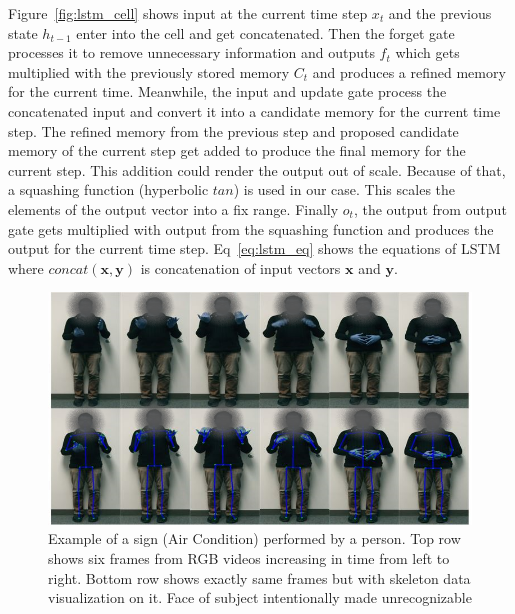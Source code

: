 \documentclass[10pt,twocolumn,letterpaper]{article}
\begin{document}
Figure~\ref{fig:lstm_cell} shows input at the current time step $x_t$ and the 
previous state $h_{t-1}$ enter into the cell and get concatenated. Then the forget gate processes it to remove
unnecessary information and outputs $f_t$ which gets multiplied with the previously 
stored memory $C_t$ and produces a refined memory for the current time. Meanwhile, the input 
and  update gate process the concatenated input and convert it into a candidate memory for the current time step. The refined memory from the previous step and proposed candidate memory of the current step get added to produce the final memory for the current step. This addition could render the output out of scale. Because of that, a squashing function (hyperbolic $tan$) is used 
in our case. This scales the elements of the output vector into a fix range. Finally $o_t$, the output 
from output gate gets multiplied with output from the squashing function and produces the output for the current time step. Eq~\ref{eq:lstm_eq} shows the equations of LSTM where $concat(\mathbf{x},\mathbf{y})$ is 
concatenation of input vectors $\mathbf{x}$ and $\mathbf{y}$.

\begin{figure}
	\begin{center}
		\includegraphics[width=.8\linewidth]{ac_person1_faceoff}
	\end{center}
	\caption{Example of a sign (Air Condition) performed by a person. Top row shows six frames from RGB videos increasing in time from left to right. Bottom row shows exactly same frames but with skeleton data visualization on it. Face of subject intentionally made unrecognizable}
	\label{fig:ac_person1}
\end{figure}
\end{document}
